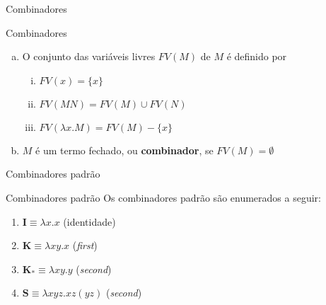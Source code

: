 \begin{frame}[fragile]{Combinadores}

    \begin{block}{Combinadores}
        \begin{enumerate}[(a)]
            \item O conjunto das variáveis livres $FV(M)$ de $M$ é definido por
            \begin{enumerate}[i.]
                \item $FV(x) = \lbrace x\rbrace$
                \item $FV(MN) = FV(M)\cup FV(N)$
                \item $FV(\lambda x.M) = FV(M) - \lbrace x\rbrace$
            \end{enumerate}

            \item $M$ é um termo fechado, ou \textbf{combinador}, se $FV(M) = \emptyset$
        \end{enumerate}
    \end{block}

\end{frame}

\begin{frame}[fragile]{Combinadores padrão}

    \begin{block}{Combinadores padrão}
        Os combinadores padrão são enumerados a seguir: 
        \begin{enumerate}
            \item $\mathbf{I} \equiv \lambda x.x$ (identidade)
            \item $\mathbf{K} \equiv \lambda xy.x$ (\textit{first})
            \item $\mathbf{K_*} \equiv \lambda xy.y$ (\textit{second})
            \item $\mathbf{S} \equiv \lambda xyz.xz(yz)$ (\textit{second})
        \end{enumerate}
    \end{block}

\end{frame}
